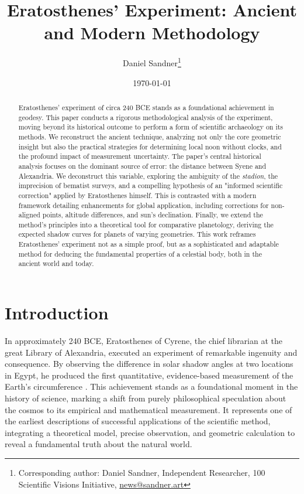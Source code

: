 \documentclass[11pt]{article}
\title{\textbf{Eratosthenes’ Experiment: Ancient and Modern Methodology}}
\author{{Daniel Sandner}\thanks{Corresponding author: Daniel Sandner, Independent Researcher, 100 Scientific Visions Initiative, \href{news@sandner.art}{news@sandner.art}}} %
\date{\today}
\begin{document}
\maketitle

\begin{abstract}
\noindent Eratosthenes' experiment of circa 240 BCE stands as a foundational achievement in geodesy. This paper conducts a rigorous methodological analysis of the experiment, moving beyond its historical outcome to perform a form of scientific archaeology on its methods. We reconstruct the ancient technique, analyzing not only the core geometric insight but also the practical strategies for determining local noon without clocks, and the profound impact of measurement uncertainty. The paper's central historical analysis focuses on the dominant source of error: the distance between Syene and Alexandria. We deconstruct this variable, exploring the ambiguity of the \textit{stadion}, the imprecision of bematist surveys, and a compelling hypothesis of an "informed scientific correction" applied by Eratosthenes himself. This is contrasted with a modern framework detailing enhancements for global application, including corrections for non-aligned points, altitude differences, and sun's declination. Finally, we extend the method's principles into a theoretical tool for comparative planetology, deriving the expected shadow curves for planets of varying geometries. This work reframes Eratosthenes' experiment not as a simple proof, but as a sophisticated and adaptable method for deducing the fundamental properties of a celestial body, both in the ancient world and today.
\end{abstract}

\section{Introduction}

In approximately 240 BCE, Eratosthenes of Cyrene, the chief librarian at the great Library of Alexandria, executed an experiment of remarkable ingenuity and consequence. By observing the difference in solar shadow angles at two locations in Egypt, he produced the first quantitative, evidence-based measurement of the Earth's circumference \cite{Heath1921}. This achievement stands as a foundational moment in the history of science, marking a shift from purely philosophical speculation about the cosmos to its empirical and mathematical measurement. It represents one of the earliest descriptions of successful applications of the scientific method, integrating a theoretical model, precise observation, and geometric calculation to reveal a fundamental truth about the natural world.
\end{document}
